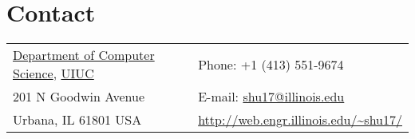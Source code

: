 
\section{\sc Contact}
\vspace{.01in}
\begin{tabular}{@{}p{3.6in}p{4in}}
{\href{http://www.cs.illinois.edu/}{Department of Computer Science}, \href{http://www.illinois.edu/}{UIUC}}     & {Phone:}  +1 (413) 551-9674 \\
{201 N Goodwin Avenue}  																																												& {E-mail:} {\href{mailto:shu17@illinois.edu}{shu17@illinois.edu}}\\
Urbana, IL 61801 USA                                                          																	& {\url{http://web.engr.illinois.edu/~shu17/}}\\
\end{tabular}




